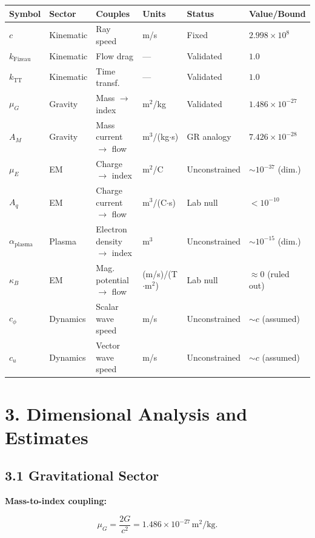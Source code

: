 \documentclass{article}
\begin{document}
\begin{center}
\begin{tabular}{llllll}
\toprule
\textbf{Symbol} & \textbf{Sector} & \textbf{Couples} & \textbf{Units} & \textbf{Status} & \textbf{Value/Bound} \\
\midrule
$c$ & Kinematic & Ray speed & m/s & Fixed & $2.998 \times 10^8$ \\
$k_{\text{Fizeau}}$ & Kinematic & Flow drag & --- & Validated & $1.0$ \\
$k_{\text{TT}}$ & Kinematic & Time transf. & --- & Validated & $1.0$ \\
\midrule
$\mu_G$ & Gravity & Mass $\to$ index & m$^2$/kg & Validated & $1.486 \times 10^{-27}$ \\
$A_M$ & Gravity & Mass current $\to$ flow & m$^3$/(kg$\cdot$s) & GR analogy & $7.426 \times 10^{-28}$ \\
\midrule
$\mu_E$ & EM & Charge $\to$ index & m$^2$/C & Unconstrained & $\sim 10^{-37}$ (dim.) \\
$A_q$ & EM & Charge current $\to$ flow & m$^3$/(C$\cdot$s) & Lab null & $< 10^{-10}$ \\
$\alpha_{\text{plasma}}$ & Plasma & Electron density $\to$ index & m$^3$ & Unconstrained & $\sim 10^{-15}$ (dim.) \\
$\kappa_B$ & EM & Mag. potential $\to$ flow & (m/s)/(T$\cdot$m$^2$) & Lab null & $\approx 0$ (ruled out) \\
\midrule
$c_\phi$ & Dynamics & Scalar wave speed & m/s & Unconstrained & $\sim c$ (assumed) \\
$c_u$ & Dynamics & Vector wave speed & m/s & Unconstrained & $\sim c$ (assumed) \\
\bottomrule
\end{tabular}
\end{center}

\section*{3. Dimensional Analysis and Estimates}

\subsection*{3.1 Gravitational Sector}

\textbf{Mass-to-index coupling:}



\[
\mu_G = \frac{2G}{c^2} = 1.486 \times 10^{-27}\,\text{m}^2/\text{kg}.
\]
\end{document}
